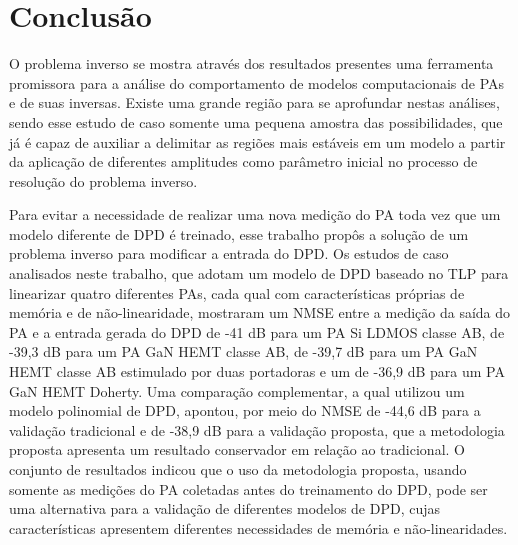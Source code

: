 \chapter{Conclusão} \label{cha:conclusao}
O problema inverso se mostra através dos resultados presentes uma ferramenta promissora para a análise do comportamento de modelos computacionais de PAs e de suas inversas. Existe uma grande região para se aprofundar nestas análises, sendo esse estudo de caso somente uma pequena amostra das possibilidades, que já é capaz de auxiliar a delimitar as regiões mais estáveis em um modelo a partir da aplicação de diferentes amplitudes como parâmetro inicial no processo de resolução do problema inverso.

Para evitar a necessidade de realizar uma nova medição do PA toda vez que um modelo diferente de DPD é treinado, esse trabalho propôs a solução de um problema inverso para modificar a entrada do DPD. Os estudos de caso analisados neste trabalho, que adotam um modelo de DPD baseado no TLP {para linearizar quatro diferentes PAs,} cada qual com características próprias de memória e de não-linearidade, mostraram um NMSE entre a medição da saída do PA e a entrada gerada do DPD de -41 dB para um PA Si LDMOS classe AB, de -39,3 dB para um PA GaN HEMT classe AB, de -39,7 dB para um PA GaN HEMT classe AB estimulado por duas portadoras e um de -36,9 dB para um PA GaN HEMT Doherty. {Uma comparação complementar, a qual utilizou um modelo polinomial de DPD, apontou, por meio do NMSE de -44,6 dB para a validação tradicional e de -38,9 dB para a validação proposta, que a metodologia proposta apresenta um resultado conservador em relação ao tradicional}. O conjunto de resultados indicou que o uso da metodologia proposta, usando somente as medições do PA coletadas antes do treinamento do DPD, pode ser uma alternativa para a validação de diferentes modelos de DPD, cujas características apresentem diferentes necessidades de memória e não-linearidades.
